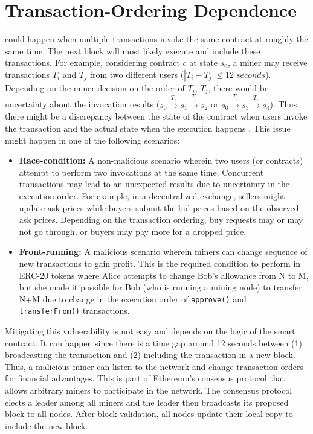 \section{Transaction-Ordering Dependence}
\mwa could happen when multiple transactions invoke the same contract at roughly the same time. The next block will most likely execute and include these transactions. For example, considering contract $c$ at state $s_0$, a miner may receive transactions $T_i$ and $T_j$ from two different users ($|T_i-T_j| \leq 12 \; seconds$). Depending on the miner decision on the order of $T_i$, $T_j$, there would be uncertainty about the invocation results (\ie $s_0 \xrightarrow{T_i} s_1 \xrightarrow{T_j} s_2$ or $s_0 \xrightarrow{T_j} s_3 \xrightarrow{T_i} s_4$). Thus, there might be a discrepancy between the state of the contract when users invoke the transaction and the actual state when the execution happens \cite{SmartContractSecurity}. This issue might happen in one of the following scenarios:
\begin{itemize}
	\item \textbf{Race-condition:} A non-malicious scenario wherein two users (or contracts) attempt to perform two invocations at the same time. Concurrent transactions may lead to an unexpected results due to uncertainty in the execution order. For example, in a decentralized exchange, sellers might update ask prices while buyers submit the bid prices based on the observed ask prices. Depending on the transaction ordering, buy requests may or may not go through, or buyers may pay more for a dropped price.
	
	\item \textbf{Front-running:} A malicious scenario wherein miners can change sequence of new transactions to gain profit. This is the required condition to perform \mwa in ERC-20 tokens where Alice attempts to change Bob’s allowance from N to M, but she made it possible for Bob (who is running a mining node) to transfer N+M due to change in the execution order of \texttt{approve()} and \texttt{transferFrom()} transactions.
\end{itemize}
Mitigating this vulnerability is not easy and depends on the logic of the smart contract. It can happen since there is a time gap around 12 seconds between (1) broadcasting the transaction and (2) including the transaction in a new block. Thus, a malicious miner can listen to the network and change transaction orders for financial advantages. This is part of Ethereum's consensus protocol that allows arbitrary miners to participate in the network. The consensus protocol elects a leader among all miners and the leader then broadcasts its proposed block to all nodes. After block validation, all nodes update their local copy to include the new block.

